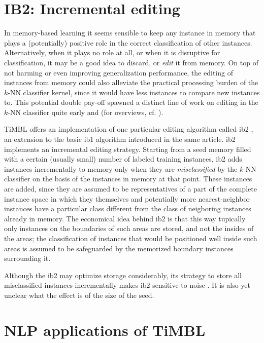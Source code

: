 \documentclass{report}
\begin{document}
\section{IB2: Incremental editing}
\label{ib2}

In memory-based learning it seems sensible to keep any instance in
memory that plays a (potentially) positive role in the correct
classification of other instances. Alternatively, when it plays no
role at all, or when it is disruptive for classification, it may be a
good idea to discard, or {\em edit} it from memory. On top of not
harming or even improving generalization performance, the editing of
instances from memory could also alleviate the practical processing
burden of the $k$-NN classifier kernel, since it would have less
instances to compare new instances to. This potential double pay-off
spawned a distinct line of work on editing in the $k$-NN classifier
quite early  and 
(for overviews, cf. ).

TiMBL offers an implementation of one particular editing algorithm
called {\sc ib2} \cite{Aha+91}, an extension to the basic {\sc ib1}
algorithm introduced in the same article. {\sc ib2} implements an
incremental editing strategy. Starting from a seed memory filled with
a certain (usually small) number of labeled training instances, {\sc
ib2} adds instances incrementally to memory only when they are {\em
misclassified}\/ by the $k$-NN classifier on the basis of the
instances in memory at that point. These instances are added, since
they are assumed to be representatives of a part of the complete
instance space in which they themselves and potentially more
nearest-neighbor instances have a particular class different from the
class of neigboring instances already in memory. The economical idea
behind {\sc ib2} is that this way tupically only instances on the
boundaries of such areas are stored, and not the insides of the areas;
the classification of instances that would be positioned well inside
such areas is assumed to be safeguarded by the memorized boundary
instances surrounding it.

Although the {\sc ib2} may optimize storage
considerably, its strategy to store all misclassified instances
incrementally makes {\sc ib2} sensitive to noise \cite{Aha+91}. It is
also yet unclear what the effect is of the size of the seed.

\section{NLP applications of TiMBL}
\label{furtherreading}
\end{document}
